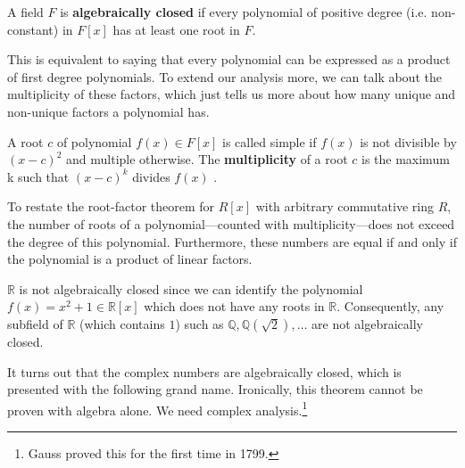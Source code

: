   \begin{definition}
    A field $F$ is \textbf{algebraically closed} if every polynomial of positive degree (i.e. non-constant) in $F[x]$ has at least one root in $F$. 
  \end{definition}

  This is equivalent to saying that every polynomial can be expressed as a product of first degree polynomials. To extend our analysis more, we can talk about the multiplicity of these factors, which just tells us more about how many unique and non-unique factors a polynomial has. 

  \begin{definition}[Multiplicity]
    A root $c$ of polynomial $f(x) \in F[x]$ is called simple if $f(x)$ is not divisible by $(x - c)^2$ and multiple otherwise. The \textbf{multiplicity} of a root $c$ is the maximum k such that $(x - c)^k$ divides $f(x)$ .
  \end{definition} 

  To restate the root-factor theorem for $R[x]$ with arbitrary commutative ring $R$, the number of roots of a polynomial---counted with multiplicity---does not exceed the degree of this polynomial. Furthermore, these numbers are equal if and only if the polynomial is a product of linear factors.

  \begin{example}
    $\mathbb{R}$ is not algebraically closed since we can identify the polynomial $f(x) = x^2 + 1 \in \mathbb{R}[x]$ which does not have any roots in $\mathbb{R}$. Consequently, any subfield of $\mathbb{R}$ (which contains $1$) such as $\mathbb{Q}, \mathbb{Q}(\sqrt{2}), \ldots$ are not algebraically closed. 
  \end{example}

  It turns out that the complex numbers are algebraically closed, which is presented with the following grand name. Ironically, this theorem cannot be proven with algebra alone. We need complex analysis.\footnote{Gauss proved this for the first time in 1799.} 

